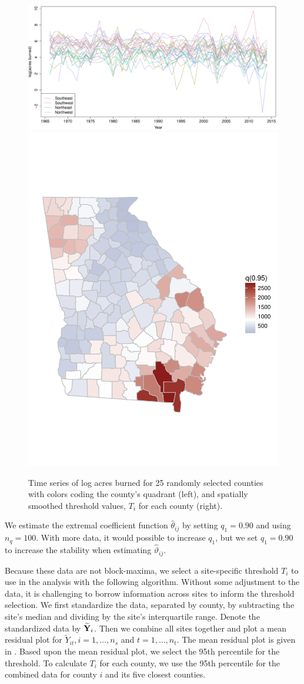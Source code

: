 \documentclass[11pt]{article}
\begin{document}
\begin{figure}[htbp]  %
  \centering
  \includegraphics[width=0.47\linewidth]{plots/fire-spag-rand-25}
  \includegraphics[width=0.47\linewidth, trim = 0 10em 0 10em]{plots/fire-spatial-q95.pdf}
  \caption{Time series of log acres burned for 25 randomly selected counties with colors coding the county's quadrant (left), and spatially smoothed threshold values, $T_i$ for each county (right).}
  \label{ebfig:firets25}
\end{figure}

We estimate the extremal coefficient function $\hat{\theta}_{ij}$ by setting $q_1 = 0.90$ and using $n_q = 100$.
With more data, it would possible to increase $q_1$, but we set $q_1 = 0.90$ to increase the stability when estimating $\hat{\vartheta}_{ij}$.

Because these data are not block-maxima, we select a site-specific threshold $T_i$ to use in the analysis with the following algorithm.
Without some adjustment to the data, it is challenging to borrow information across sites to inform the threshold selection.
We first standardize the data, separated by county, by subtracting the site's median and dividing by the site's interquartile range.
Denote the standardized data by $\widetilde{\mbox{\bf Y}}_i$.
Then we combine all sites together and plot a mean residual plot for $\widetilde{Y}_{it}, i = 1, \ldots, n_s$ and $t = 1, \ldots, n_t$.
The mean residual plot is given in .
Based upon the mean residual plot, we select the 95th percentile for the threshold.
To calculate $T_i$ for each county, we use the 95th percentile for the combined data for county $i$ and its five closest counties.
\end{document}
